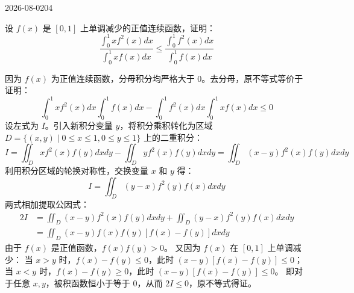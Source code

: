 \begin{mistake}{2026-08-02}{04}

\begin{problemcontent}
设 \(f(x)\) 是 \([0,1]\) 上单调减少的正值连续函数，证明：
\[
\frac{\int_0^1 x f^2(x) dx}{\int_0^1 x f(x) dx} \le \frac{\int_0^1 f^2(x) dx}{\int_0^1 f(x) dx}
\]
\end{problemcontent}

\begin{solutioncontent}
因为 \(f(x)\) 为正值连续函数，分母积分均严格大于 \(0\)。去分母，原不等式等价于证明：
\[
\int_0^1 x f^2(x) dx \int_0^1 f(x) dx - \int_0^1 f^2(x) dx \int_0^1 x f(x) dx \le 0
\]
设左式为 \(I\)。引入新积分变量 \(y\)，将积分乘积转化为区域 \(D = \{(x,y) \mid 0 \le x \le 1, 0 \le y \le 1\}\) 上的二重积分：
\[
I = \iint_D x f^2(x) f(y) dx dy - \iint_D y f^2(x) f(y) dx dy = \iint_D (x - y) f^2(x) f(y) dx dy
\]
利用积分区域的轮换对称性，交换变量 \(x\) 和 \(y\) 得：
\[
I = \iint_D (y - x) f^2(y) f(x) dx dy
\]
两式相加提取公因式：
\[
\begin{aligned}
2I &= \iint_D (x - y) f^2(x) f(y) dx dy + \iint_D (y - x) f^2(y) f(x) dx dy \\
&= \iint_D (x - y) f(x) f(y) \left[ f(x) - f(y) \right] dx dy
\end{aligned}
\]
由于 \(f(x)\) 是正值函数，\(f(x)f(y) > 0\)。
又因为 \(f(x)\) 在 \([0,1]\) 上单调减少：
当 \(x > y\) 时，\(f(x) - f(y) \le 0\)，此时 \((x - y)[f(x) - f(y)] \le 0\)；
当 \(x < y\) 时，\(f(x) - f(y) \ge 0\)，此时 \((x - y)[f(x) - f(y)] \le 0\)。
即对于任意 \(x, y\)，被积函数恒小于等于 \(0\)，从而 \(2I \le 0\)，原不等式得证。
\end{solutioncontent}


\end{mistake}

